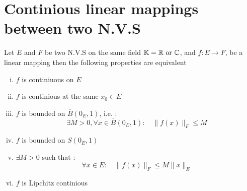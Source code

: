 \chapter{Continious linear mappings between two N.V.S}
\begin{theorem}[Fundamental]
	Let $E$ and $F$ be two N.V.S on the same field $\mathbb{K} = \mathbb{R} \text{ or } \mathbb{C} $,
	and $ f : E \longrightarrow F $, be a linear mapping then the following 
	properties are equivalent 
	\begin{enumerate}[(i)]
	\item  $f$ is continiuous on $E$ 
	\item $f$ is continious at the same $x_0 \in E$  
	\item $f$ is bounded on $\overline{B} \left( 0_{E},1 \right)$, i.e. : 
		\[
		\exists M > 0, \forall x \in  \overline{B}\left( 0_{E},1 \right) :
		\quad \| f(x)  \| _{F} \leq M
		\]
	\item   $f$ is bounded on $S \left( 0_{E},1 \right)$ 
	\item $\exists M > 0$ such that : 
		\[
			\forall x \in E : 
			\quad \| f(x)  \| _{F} \leq 
			M \| x \| _{E}
		\]
	\item $f$ is Lipchitz continious  
	\end{enumerate}
\end{theorem}
